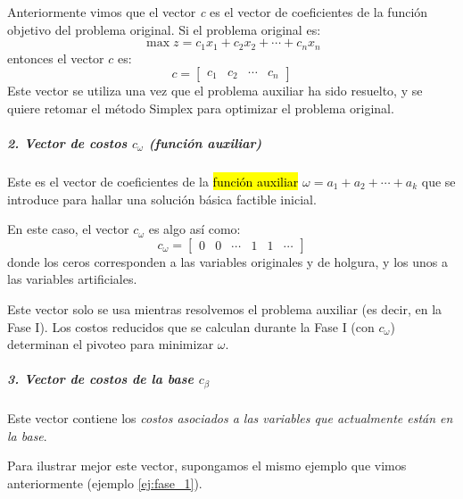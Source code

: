 Anteriormente vimos que el vector \textit{c} es el vector de coeficientes de la función objetivo del problema original. Si el problema original es:
\[
  \max z = c_1 x_1 + c_2 x_2 + \cdots + c_n x_n
\]
entonces el vector \(c\) es:
\[
  c = \begin{bmatrix} c_1 & c_2 & \cdots & c_n \end{bmatrix}
\]
Este vector se utiliza una vez que el problema auxiliar ha sido resuelto, y se quiere retomar el método Simplex para optimizar el problema original.

\subparagraph{2. Vector de costos \(c_\omega\) (función auxiliar)}

Este es el vector de coeficientes de la \hl{función auxiliar} \(\omega = a_1 + a_2 + \cdots + a_k\) que se introduce para hallar una solución básica factible inicial.

En este caso, el vector \(c_\omega\) es algo así como:
\[
  c_\omega = \begin{bmatrix} 0 & 0 & \cdots & 1 & 1 & \cdots \end{bmatrix}
\]
donde los ceros corresponden a las variables originales y de holgura, y los unos a las variables artificiales.

Este vector solo se usa mientras resolvemos el problema auxiliar (es decir, en la Fase I). Los costos reducidos que se calculan durante la Fase I (con \(c_\omega\)) determinan el pivoteo para minimizar \(\omega\).

\vspace{5mm}

\subparagraph{3. Vector de costos de la base \(c_\beta\)}

Este vector contiene los \textit{costos asociados a las variables que actualmente están en la base}.

Para ilustrar mejor este vector, supongamos el mismo ejemplo que vimos anteriormente (ejemplo \ref{ej:fase_1}).

